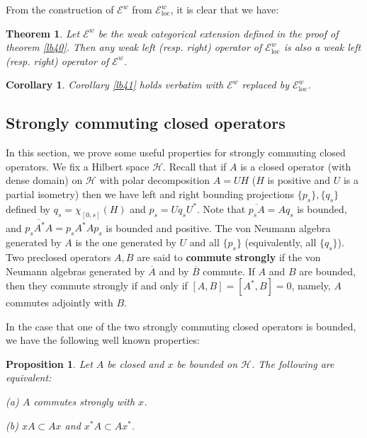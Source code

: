 \documentclass[12pt,a4paper]{article}
\theoremstyle{definition}
\theoremstyle{plain}
\newtheorem{thm}[df]{Theorem}
\newtheorem{pp}[df]{Proposition}
\newtheorem{co}[df]{Corollary}
\newcommand{\mc}{\mathcal}
\newcommand{\ovl}{\overline}
\newcommand{\loc}{\mathrm{loc}}
\newcommand{\scr}{\mathscr}
\numberwithin{equation}{subsection}
\begin{document}
From the construction of $\scr E^w$ from $\scr E^w_\loc$, it is clear that we have:

\begin{thm}
Let $\scr E^w$ be the weak categorical extension defined in the proof of theorem \ref{lb40}. Then any weak left (resp. right) operator of $\scr E^w_{\loc}$ is also a weak left (resp. right) operator of $\scr E^w$.
\end{thm}


\begin{co}\label{lb62}
Corollary \ref{lb41} holds verbatim with $\scr E^w$ replaced by $\scr E^w_\loc$.
\end{co}



\begin{subappendices}



\subsection{Strongly commuting closed operators}\label{lb9}

In this section, we prove some useful properties for strongly commuting closed operators. We fix a Hilbert space $\mc H$. Recall that if $A$ is a closed operator (with dense domain) on $\mc H$ with polar decomposition $A=UH$ ($H$ is positive and $U$ is a partial isometry)  then we have left and right bounding projections $\{p_s\},\{q_s\}$ defined by  $q_s=\chi_{[0,s]}(H)$ and $p_s=Uq_sU^*$. Note that $\ovl{p_sA}=Aq_s$ is bounded, and $\ovl{p_sA^*A}=p_s A^*Ap_s$ is bounded and positive. The von Neumann algebra generated by $A$ is the one generated by $U$ and all $\{p_s\}$ (equivalently, all $\{q_s\}$). Two preclosed operators $A,B$ are said to \textbf{commute strongly} if the von Neumann algebras generated by $\ovl{A}$ and by $\ovl{B}$ commute. If $A$ and $B$ are bounded, then they commute strongly if and only if $[A,B]=[A^*,B]=0$, namely, $A$ commutes adjointly with $B$.

In the case that one of the two strongly commuting closed operators is bounded, we have the following well known properties:

\begin{pp}\label{lb15}
	Let $A$ be closed and $x$ be bounded on $\mc H$. The following are equivalent:
	
	(a) $A$ commutes strongly with $x$.
	
	(b) $xA\subset Ax$ and $x^*A\subset Ax^*$.
	

\end{pp}
\end{subappendices}
\end{document}
